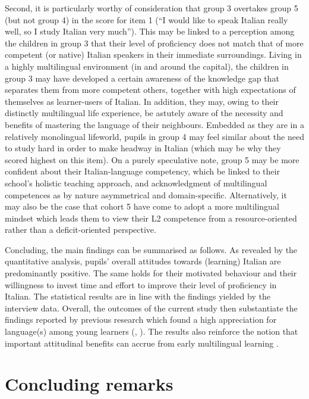 \documentclass[output=paper]{../langscibook}
\begin{document}
Second, it is particularly worthy of consideration that group 3 overtakes group 5 (but not group 4) in the score for item 1 (``I would like to speak Italian really well, so I study Italian very much''). This may be linked to a perception among the children in group 3 that their level of proficiency does not match that of more competent (or native) Italian speakers in their immediate surroundings. Living in a highly multilingual environment (in and around the capital), the children in group 3 may have developed a certain awareness of the knowledge gap that separates them from more competent others, together with high expectations of themselves as learner-users of Italian. In addition, they may, owing to their distinctly multilingual life experience, be astutely aware of the necessity and benefits of mastering the language of their neighbours. Embedded as they are in a relatively monolingual lifeworld, pupils in group 4 may feel similar about the need to study hard in order to make headway in Italian (which may be why they scored highest on this item). On a purely speculative note, group 5 may be more confident about their Italian-language competency, which be linked to their school’s holistic teaching approach, and acknowledgment of multilingual competences as by nature asymmetrical and domain-specific. Alternatively, it may also be the case that cohort 5 have come to adopt a more multilingual mindset which leads them to view their L2 competence from a resource-oriented rather than a deficit-oriented perspective.

Concluding, the main findings can be summarised as follows. As revealed by the quantitative analysis, pupils’ overall attitudes towards (learning) Italian are predominantly positive. The same holds for their motivated behaviour and their willingness to invest time and effort to improve their level of proficiency in Italian. The statistical results are in line with the findings yielded by the interview data. Overall, the outcomes of the current study then substantiate the findings reported by previous research which found a high appreciation for language(s) among young learners (\citealt{Nikolov1999}, \citealt{Shameem2004}). The results also reinforce the notion that important attitudinal benefits can accrue from early multilingual learning \citep{Helot2008}.

\section{Concluding remarks}
\end{document}
